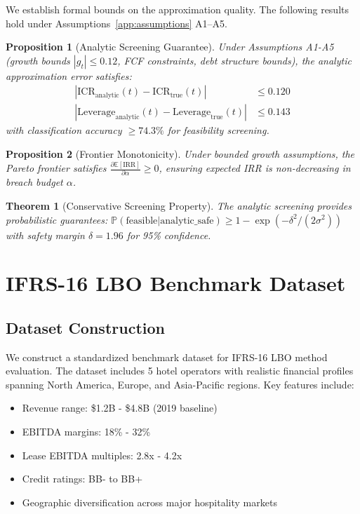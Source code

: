 \documentclass[11pt,a4paper]{article}
\newtheorem{proposition}{Proposition}
\newtheorem{theorem}{Theorem}
\newcommand{\E}{\mathbb{E}}
\newcommand{\Prob}{\mathbb{P}}
\newcommand{\alphabudget}{\alpha}   %
\begin{document}
We establish formal bounds on the approximation quality. The following results hold under Assumptions~\ref{app:assumptions} A1–A5.

\begin{proposition}[Analytic Screening Guarantee]\label{prop:screen}
Under Assumptions A1-A5 (growth bounds $|g_t| \leq 0.12$, FCF constraints, debt structure bounds), the analytic approximation error satisfies:
\begin{align}
|\text{ICR}_{\text{analytic}}(t) - \text{ICR}_{\text{true}}(t)| &\leq 0.120 \\
|\text{Leverage}_{\text{analytic}}(t) - \text{Leverage}_{\text{true}}(t)| &\leq 0.143
\end{align}
with classification accuracy $\geq 74.3\%$ for feasibility screening.
\end{proposition}

\begin{proposition}[Frontier Monotonicity]\label{prop:mono}
Under bounded growth assumptions, the Pareto frontier satisfies $\frac{\partial \E[\text{IRR}]}{\partial \alphabudget} \geq 0$, ensuring expected IRR is non-decreasing in breach budget $\alphabudget$.
\end{proposition}

\begin{theorem}[Conservative Screening Property]\label{thm:conservative}
The analytic screening provides probabilistic guarantees: $\Prob(\text{feasible} | \text{analytic\_safe}) \geq 1 - \exp(-\delta^2/(2\sigma^2))$ with safety margin $\delta = 1.96$ for 95\% confidence.
\end{theorem}

\section{IFRS-16 LBO Benchmark Dataset}

\subsection{Dataset Construction}

We construct a standardized benchmark dataset for IFRS-16 LBO method evaluation. The dataset includes 5 hotel operators with realistic financial profiles spanning North America, Europe, and Asia-Pacific regions. Key features include:

\begin{itemize}
\item Revenue range: \$1.2B - \$4.8B (2019 baseline)
\item EBITDA margins: 18\% - 32\%  
\item Lease EBITDA multiples: 2.8x - 4.2x
\item Credit ratings: BB- to BB+
\item Geographic diversification across major hospitality markets
\end{itemize}
\end{document}
